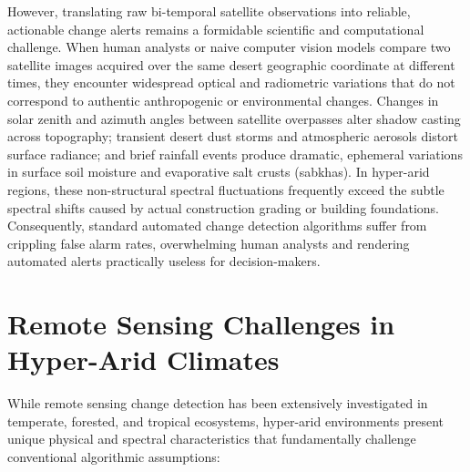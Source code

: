 However, translating raw bi-temporal satellite observations into reliable, actionable change alerts remains a formidable scientific and computational challenge. When human analysts or naive computer vision models compare two satellite images acquired over the same desert geographic coordinate at different times, they encounter widespread optical and radiometric variations that do not correspond to authentic anthropogenic or environmental changes. Changes in solar zenith and azimuth angles between satellite overpasses alter shadow casting across topography; transient desert dust storms and atmospheric aerosols distort surface radiance; and brief rainfall events produce dramatic, ephemeral variations in surface soil moisture and evaporative salt crusts (sabkhas). In hyper-arid regions, these non-structural spectral fluctuations frequently exceed the subtle spectral shifts caused by actual construction grading or building foundations. Consequently, standard automated change detection algorithms suffer from crippling false alarm rates, overwhelming human analysts and rendering automated alerts practically useless for decision-makers.

\section{Remote Sensing Challenges in Hyper-Arid Climates}
\label{sec:intro_arid_challenges}
While remote sensing change detection has been extensively investigated in temperate, forested, and tropical ecosystems, hyper-arid environments present unique physical and spectral characteristics that fundamentally challenge conventional algorithmic assumptions:

